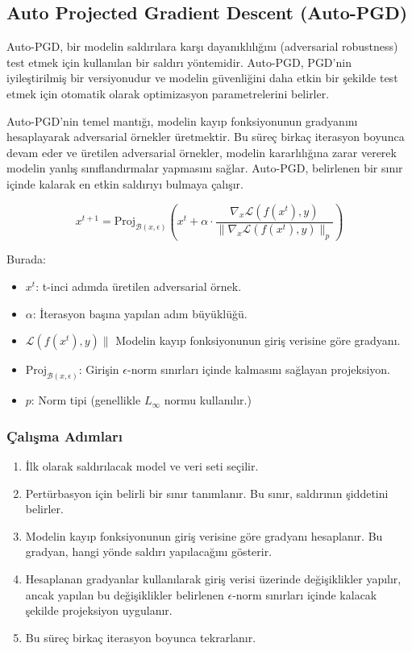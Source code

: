 \newpage

\subsection{Auto Projected Gradient Descent (Auto-PGD)}

Auto-PGD, bir modelin saldırılara karşı dayanıklılığını (adversarial robustness) test etmek için kullanılan bir saldırı yöntemidir. Auto-PGD, PGD'nin iyileştirilmiş bir versiyonudur ve modelin güvenliğini daha etkin bir şekilde test etmek için otomatik olarak optimizasyon parametrelerini belirler. 

Auto-PGD'nin temel mantığı, modelin kayıp fonksiyonunun gradyanını hesaplayarak adversarial örnekler üretmektir. Bu süreç birkaç iterasyon boyunca devam eder ve üretilen adversarial örnekler, modelin kararlılığına zarar vererek modelin yanlış sınıflandırmalar yapmasını sağlar. Auto-PGD, belirlenen bir sınır içinde kalarak en etkin saldırıyı bulmaya çalışır.

\[ x^{t+1} = \text{Proj}_{\mathcal{B}(x, \epsilon)} \left( x^t + \alpha \cdot \frac{\nabla_x \mathcal{L}(f(x^t), y)}{\|\nabla_x \mathcal{L}(f(x^t), y)\|_p} \right) \]

Burada:

\begin{itemize}
    \item $x^t$: t-inci adımda üretilen adversarial örnek.
    \item $\alpha$: İterasyon başına yapılan adım büyüklüğü.
    \item $\mathcal{L}(f(x^t), y)\|$ Modelin kayıp fonksiyonunun giriş verisine göre gradyanı.
    \item $\text{Proj}_{\mathcal{B}(x, \epsilon)}$: Girişin $\epsilon$-norm sınırları içinde kalmasını sağlayan projeksiyon.
    \item $p$: Norm tipi (genellikle $L_\infty$ normu kullanılır.)
\end{itemize}

\subsubsection{Çalışma Adımları}

\begin{enumerate}
    \item İlk olarak saldırılacak model ve veri seti seçilir.
    \item Pertürbasyon için belirli bir sınır tanımlanır. Bu sınır, saldırının şiddetini belirler.
    \item Modelin kayıp fonksiyonunun giriş verisine göre gradyanı hesaplanır. Bu gradyan, hangi yönde saldırı yapılacağını gösterir.
    \item Hesaplanan gradyanlar kullanılarak giriş verisi üzerinde değişiklikler yapılır, ancak yapılan bu değişiklikler belirlenen $\epsilon$-norm sınırları içinde kalacak şekilde projeksiyon uygulanır.
    \item Bu süreç birkaç iterasyon boyunca tekrarlanır.
\end{enumerate}

